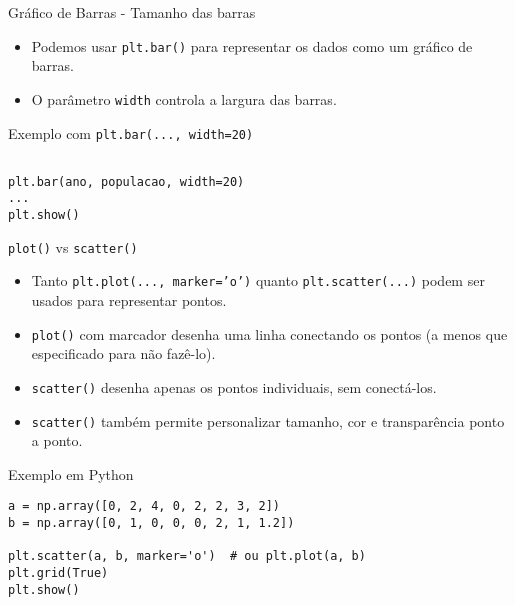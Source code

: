 \begin{frame}[fragile]{Gráfico de Barras - Tamanho das barras}
    \begin{itemize}
        \item Podemos usar \texttt{plt.bar()} para representar os dados como um gráfico de barras.
        \item O parâmetro \texttt{width} controla a largura das barras.
    \end{itemize}

    \begin{block}{Exemplo com \texttt{plt.bar(..., width=20)}}
        \begin{verbatim}

plt.bar(ano, populacao, width=20)
...
plt.show()
\end{verbatim}
    \end{block}
\end{frame}

\begin{frame}[fragile]{\texttt{plot()} vs \texttt{scatter()}}
    \begin{itemize}
        \item Tanto \texttt{plt.plot(..., marker='o')} quanto \texttt{plt.scatter(...)} podem ser usados para representar pontos.
        \item \texttt{plot()} com marcador desenha uma linha conectando os pontos (a menos que especificado para não fazê-lo).
        \item \texttt{scatter()} desenha apenas os pontos individuais, sem conectá-los.
        \item \texttt{scatter()} também permite personalizar tamanho, cor e transparência ponto a ponto.
    \end{itemize}

    \begin{block}{Exemplo em Python}
        \begin{verbatim}
a = np.array([0, 2, 4, 0, 2, 2, 3, 2])
b = np.array([0, 1, 0, 0, 0, 2, 1, 1.2])

plt.scatter(a, b, marker='o')  # ou plt.plot(a, b)
plt.grid(True)
plt.show()
\end{verbatim}
    \end{block}
\end{frame}

